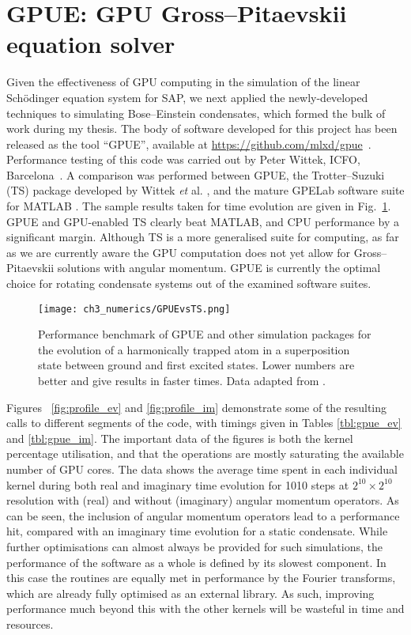 \section{GPUE: GPU Gross--Pitaevskii equation solver}\label{sec:GPUE}

Given the effectiveness of GPU computing in the simulation of the linear Sch\"odinger equation system for SAP, we next applied the newly-developed techniques to simulating Bose--Einstein condensates, which formed the bulk of work during my thesis. The body of software developed for this project has been released as the tool ``GPUE'', available at \url{https://github.com/mlxd/gpue}~\cite{MLXD_GPUE}. Performance testing of this code was carried out by Peter Wittek, ICFO, Barcelona~\cite{Wittek:2016}. A comparison was performed between GPUE, the Trotter--Suzuki (TS) package developed by Wittek \textit{et} al. \cite{NUM:Wittek_cpc_2013}, and the mature GPELab software suite for MATLAB \cite{NUM:GPElab_1,NUM:GPElab_2}. The sample results taken for time evolution are given in Fig.~\ref{fig:gpuevsts}. GPUE and GPU-enabled TS clearly beat MATLAB, and CPU performance by a significant margin. Although TS is a more generalised suite for computing, as far as we are currently aware the GPU computation does not yet allow for Gross--Pitaevskii solutions with angular momentum. GPUE is currently the optimal choice for rotating condensate systems out of the examined software suites.

\begin{figure}[htb]
    \centering
    \texttt{[image: ch3\_numerics/GPUEvsTS.png]}
    \caption{Performance benchmark of GPUE and other simulation packages for the evolution of a harmonically trapped atom in a superposition state between ground and first excited states. Lower numbers are better and give results in faster times. Data adapted from \cite{Wittek:2016}. }
    \label{fig:gpuevsts}
\end{figure}

Figures ~\ref{fig:profile_ev} and \ref{fig:profile_im} demonstrate some of the resulting calls to different segments of the code, with timings given in Tables \ref{tbl:gpue_ev} and \ref{tbl:gpue_im}. The important data of the figures is both the kernel percentage utilisation, and that the operations are mostly saturating the available number of GPU cores. The data shows the average time spent in each individual kernel during both real and imaginary time evolution for 1010 steps at $2^{10}\times 2^{10}$ resolution with (real) and without (imaginary) angular momentum operators. As can be seen, the inclusion of angular momentum operators lead to a performance hit, compared with an imaginary time evolution for a static condensate. While further optimisations can almost always be provided for such simulations, the performance of the software as a whole is defined by its slowest component. In this case the routines are equally met in performance by the Fourier transforms, which are already fully optimised as an external library. As such, improving performance much beyond this with the other kernels will be wasteful in time and resources.

